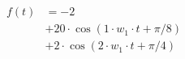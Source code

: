 \correct
\begin{center}
\begin{align*}
f(t) &= -2 \\
&+ 20 \cdot \cos( 1 \cdot w_1 \cdot t +\pi/8 ) \\
&+  2 \cdot \cos( 2 \cdot w_1 \cdot t +\pi/4)
\end{align*}
\end{center}
